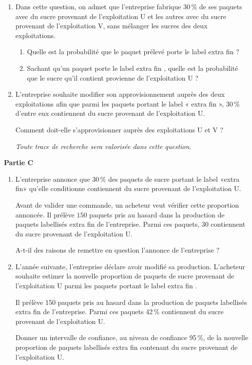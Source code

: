\documentclass{cornouaille}
\begin{document}
\begin{exercice}
\medskip
 
\begin{enumerate}
\item Dans cette question, on admet que l'entreprise fabrique 30\,\% de ses paquets avec du sucre
provenant de l'exploitation U et les autres avec du sucre provenant de l'exploitation V,
sans mélanger les sucres des deux exploitations.
	\begin{enumerate}
		\item Quelle est la probabilité que le paquet prélevé porte le label \og extra fin \fg{} ?
		\item Sachant qu'un paquet porte le label \og extra fin \fg, quelle est la probabilité que le sucre
qu'il contient provienne de l'exploitation U ?
 	\end{enumerate}
\item L'entreprise souhaite modifier son approvisionnement auprès des deux exploitations afin
que parmi les paquets portant le label « extra fin », 30\,\% d'entre eux contiennent du sucre
provenant de l'exploitation U.
	
Comment doit-elle s'approvisionner auprès des exploitations U et V ?
	
\emph{Toute trace de recherche sera valorisée dans cette question}.
\end{enumerate}

\bigskip

\textbf{Partie C}

\medskip

\begin{enumerate}
\item L'entreprise annonce que 30\,\% des paquets de sucre portant le label «extra fin» qu'elle
conditionne contiennent du sucre provenant de l'exploitation U.

Avant de valider une commande, un acheteur veut vérifier cette proportion annoncée. Il
prélève $150$ paquets pris au hasard dans la production de paquets labellisés \og extra fin \fg{} de
l'entreprise. Parmi ces paquets, $30$ contiennent du sucre provenant de l'exploitation U.

A-t-il des raisons de remettre en question l'annonce de l'entreprise ?
\item  L'année suivante, l'entreprise déclare avoir modifié sa production. L'acheteur souhaite
estimer la nouvelle proportion de paquets de sucre provenant de l'exploitation U parmi les
paquets portant le label \og extra fin \fg. 

Il prélève 150 paquets pris au hasard dans la production de paquets labellisés \og extra fin \fg{} de l'entreprise. Parmi ces paquets 42\,\% contiennent du sucre provenant de l'exploitation U.

Donner un intervalle de confiance, au niveau de confiance 95\,\%, de la nouvelle proportion
de paquets labellisés \og extra fin \fg{} contenant du sucre provenant de l'exploitation U.
\end{enumerate}
\end{exercice}
\vspace{0,5cm}
\end{document}
